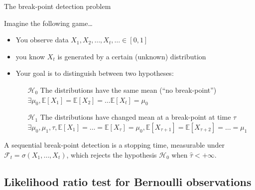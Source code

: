 \documentclass[11pt,english,ignorenonframetext,]{beamer}
\begin{document}
\begin{frame}{The break-point detection problem}

  Imagine the following game\ldots

  \begin{itemize}
    \item You observe data $X_1,X_2,\ldots,X_t,\ldots \in[0,1]$
    \item you know $X_t$ is generated by a certain (unknown) distribution

    \item \alert{Your goal} is to distinguish between two hypotheses:
    \begin{itemize}
      \item[$\mathcal{H}_0$] The distributions have the same mean \hfill{} (``no break-point'')\\
      $\exists \mu_0, \mathbb{E}[X_1] = \mathbb{E}[X_2] = \ldots \mathbb{E}[X_t] = \mu_0$

      \item[$\mathcal{H}_1$] The distributions have changed mean at a break-point at time $\tau$ \\
      $\exists \mu_0, \mu_1, \tau, \mathbb{E}[X_1] = \ldots = \mathbb{E}[X_{\tau}] = \mu_0, \mathbb{E}[X_{\tau+1}] = \mathbb{E}[X_{\tau+2}] = \ldots = \mu_1$
    \end{itemize}
  \end{itemize}

  \pause
  A \alert{sequential break-point detection} is a stopping time,
  measurable under $\mathcal{F}_t = \sigma(X_1,\dots,X_t)$,
  which rejects the hypothesis $\mathcal{H}_0$
  when $\widehat{\tau} < +\infty$.

\end{frame}


\subsection{\hfill{}Likelihood ratio test for Bernoulli observations\hfill{}}
\end{document}
